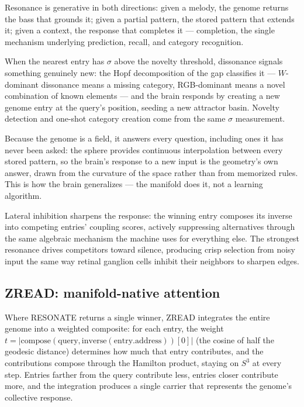 \documentclass[12pt,a4paper]{article}
\theoremstyle{definition}
\theoremstyle{remark}
\begin{document}
Resonance is generative in both directions: given a melody, the genome returns
the bass that grounds it; given a partial pattern, the stored pattern that
extends it; given a context, the response that completes it --- completion,
the single mechanism underlying prediction, recall, and category recognition.

When the nearest entry has $\sigma$ above the novelty threshold, dissonance
signals something genuinely new: the Hopf decomposition of the gap classifies
it --- $W$-dominant dissonance means a missing category, RGB-dominant means
a novel combination of known elements --- and the brain responds by creating
a new genome entry at the query's position, seeding a new attractor basin.
Novelty detection and one-shot category creation come from the same
$\sigma$ measurement.

Because the genome is a field, it answers every question, including ones it
has never been asked: the sphere provides continuous interpolation between
every stored pattern, so the brain's response to a new input is the geometry's
own answer, drawn from the curvature of the space rather than from memorized
rules. This is how the brain generalizes --- the manifold does it, not a
learning algorithm.

Lateral inhibition sharpens the response: the winning entry composes its
inverse into competing entries' coupling scores, actively suppressing
alternatives through the same algebraic mechanism the machine uses for
everything else. The strongest resonance drives competitors toward silence,
producing crisp selection from noisy input the same way retinal ganglion
cells inhibit their neighbors to sharpen edges.

\subsection{ZREAD: manifold-native attention}

Where RESONATE returns a single winner, ZREAD integrates the entire genome
into a weighted composite: for each entry, the weight
$t = |\mathrm{compose}(\mathrm{query},
\mathrm{inverse}(\mathrm{entry.address}))[0]|$ (the cosine of half the
geodesic distance) determines how much that entry contributes, and the
contributions compose through the Hamilton product, staying on $S^3$ at
every step. Entries farther from the query contribute less, entries closer
contribute more, and the integration produces a single carrier that
represents the genome's collective response.
\end{document}
